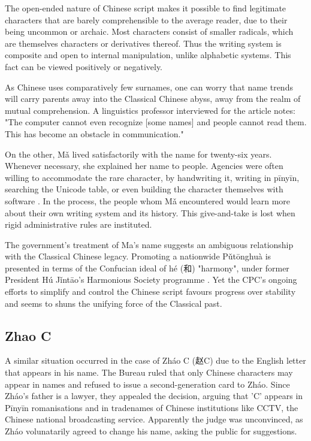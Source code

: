 The open-ended nature of Chinese script makes it possible to find legitimate
characters that are barely comprehensible to the average reader, due to their
being uncommon or archaic. Most characters consist of smaller radicals, which
are themselves characters or derivatives thereof. Thus the writing system is
composite and open to internal manipulation, unlike alphabetic systems. This
fact can be viewed positively or negatively.

As Chinese uses comparatively few surnames, one can worry that name trends will
carry parents away into the Classical Chinese abyss, away from the realm of
mutual comprehension. A linguistics professor interviewed for the
\textcite{lafraniere09} article notes: "The computer cannot even recognize [some
names] and people cannot read them. This has become an obstacle in
communication."

On the other, Mǎ lived satisfactorily with the name for twenty-six years.
Whenever necessary, she explained her name to people. Agencies were often
willing to accommodate the rare character, by handwriting it, writing in pīnyīn,
searching the Unicode table, or even building the character themselves with
software \parencite{martinsen08}. In the process, the people whom Mǎ encountered
would learn more about their own writing system and its history. This
give-and-take is lost when rigid administrative rules are instituted.

The government's treatment of Ma's name suggests an ambiguous relationship with
the Classical Chinese legacy. Promoting a nationwide Pǔtōnghuà is presented in
terms of the Confucian ideal of hé ({\zafont 和}) "harmony", under former
President Hú Jǐntāo's Harmonious Society programme \parencite{wang16}. Yet the
CPC's ongoing efforts to simplify and control the Chinese script favours
progress over stability and seems to shuns the unifying force of the Classical
past.

\subsection{Zhao C}

A similar situation occurred in the case of Zháo C ({\zafont 赵}C) due to the
English letter that appears in his name. The Bureau ruled that only Chinese
characters may appear in names and refused to issue a second-generation card to
Zháo. Since Zháo's father is a lawyer, they appealed the decision, arguing that
'C' appears in Pīnyīn romanisations and in tradenames of Chinese institutions
like CCTV, the Chinese national broadcasting service. Apparently the judge was
unconvinced, as Zháo volunatarily agreed to change his name, asking the public
for suggestions. \parencite{martinsen09}


